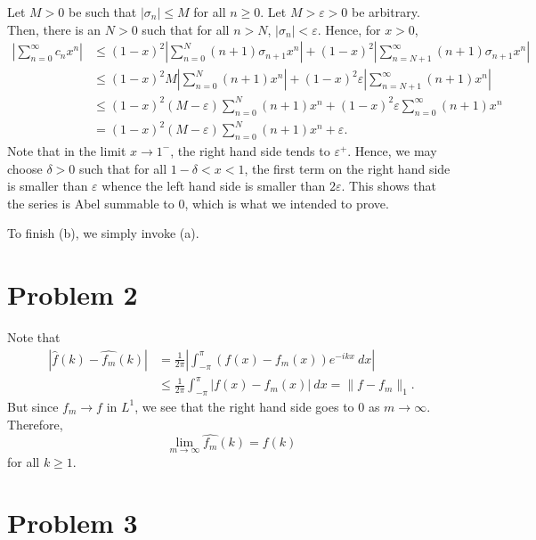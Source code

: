 \documentclass[12pt]{amsart}
\newcommand{\wh}[1]{\widehat{#1}}
\begin{document}
\begin{enumerate}[label=(\alph*)]
Let $M > 0$ be such that $|\sigma_n|\le M$ for all $n\ge 0$. Let $M > \varepsilon > 0$ be arbitrary. Then, there is an $N > 0$ such that for all $n > N$, $|\sigma_n| < \varepsilon$. Hence, for $x > 0$,
\begin{align*}
	\left|\sum_{n = 0}^\infty c_nx^n\right| &\le (1 - x)^2\left|\sum_{n = 0}^N (n + 1)\sigma_{n + 1}x^n\right| + (1 - x)^2\left|\sum_{n = N + 1}^\infty (n + 1)\sigma_{n + 1}x^n\right|\\
	&\le (1-x)^2M\left|\sum_{n = 0}^N(n + 1)x^n\right| + (1 - x)^2\varepsilon\left|\sum_{n = N + 1}^\infty(n + 1)x^n\right|\\
	&\le (1 - x)^2(M - \varepsilon)\sum_{n = 0}^N(n + 1)x^n + (1 - x)^2\varepsilon\sum_{n = 0}^\infty (n + 1)x^n\\
	&= (1 - x)^2(M - \varepsilon)\sum_{n = 0}^N (n + 1)x^n + \varepsilon.
\end{align*}
Note that in the limit $x\to 1^-$, the right hand side tends to $\varepsilon^+$. Hence, we may choose $\delta > 0$ such that for all $1 - \delta < x < 1$, the first term on the right hand side is smaller than $\varepsilon$ whence the left hand side is smaller than $2\varepsilon$. This shows that the series is Abel summable to $0$, which is what we intended to prove.

To finish (b), we simply invoke (a).
\end{enumerate}

\section*{Problem 2}

Note that 
\begin{align*}
	|\wh f(k) - \wh{f_m}(k)| &= \frac{1}{2\pi}\left|\int_{-\pi}^\pi \left(f(x) - f_m(x)\right)e^{-ikx}~dx\right|\\
	&\le\frac{1}{2\pi}\int_{-\pi}^\pi |f(x) - f_m(x)|~dx = \|f - f_m\|_1.
\end{align*}
But since $f_m\to f$ in $L^1$, we see that the right hand side goes to $0$ as $m\to\infty$. Therefore,
\begin{equation*}
	\lim_{m\to\infty} \wh{f_m}(k) = f(k)
\end{equation*}
for all $k\ge 1$.

\section*{Problem 3}
\end{document}
